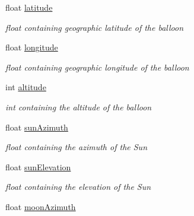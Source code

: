 \begin{DoxyCompactItemize}
\item 
\mbox{\label{classIEvent_a94d93d72078bcf03636bbf0e85e74d92}} 
float \hyperlink{classIEvent_a94d93d72078bcf03636bbf0e85e74d92}{latitude}
\begin{DoxyCompactList}\small\item\em float containing geographic latitude of the balloon \end{DoxyCompactList}\item 
\mbox{\label{classIEvent_a4ac59f6f9eec46a09caba737e462ce2a}} 
float \hyperlink{classIEvent_a4ac59f6f9eec46a09caba737e462ce2a}{longitude}
\begin{DoxyCompactList}\small\item\em float containing geographic longitude of the balloon \end{DoxyCompactList}\item 
\mbox{\label{classIEvent_aa14190ff4b5069fcb10a27965bb16530}} 
int \hyperlink{classIEvent_aa14190ff4b5069fcb10a27965bb16530}{altitude}
\begin{DoxyCompactList}\small\item\em int containing the altitude of the balloon \end{DoxyCompactList}\item 
\mbox{\label{classIEvent_a8fc6384a7420498d37420fb310979ad0}} 
float \hyperlink{classIEvent_a8fc6384a7420498d37420fb310979ad0}{sun\+Azimuth}
\begin{DoxyCompactList}\small\item\em float containing the azimuth of the Sun \end{DoxyCompactList}\item 
\mbox{\label{classIEvent_a8baa7fd7060b687937d335f02e1e52af}} 
float \hyperlink{classIEvent_a8baa7fd7060b687937d335f02e1e52af}{sun\+Elevation}
\begin{DoxyCompactList}\small\item\em float containing the elevation of the Sun \end{DoxyCompactList}\item 
\mbox{\label{classIEvent_a39ff2d848515814ea91c55b74d779e15}} 
float \hyperlink{classIEvent_a39ff2d848515814ea91c55b74d779e15}{moon\+Azimuth}

\end{DoxyCompactItemize}
